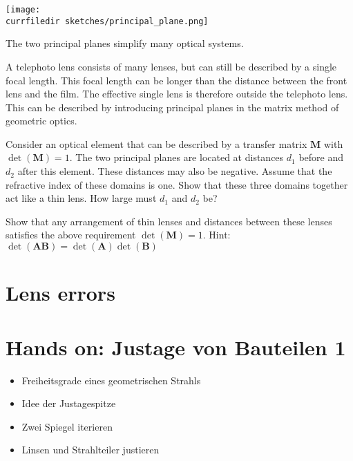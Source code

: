 \begin{marginfigure}
    \texttt{[image: \\currfiledir sketches/principal\_plane.png]}
   \caption{The two principal planes simplify many optical systems.}
\end{marginfigure}

\begin{questions}
\item A telephoto lens consists of many lenses, but can still be described by a single focal length. This focal length can be longer than the distance between the front lens and the film. The effective single lens is therefore outside the telephoto lens. This can be described by introducing principal planes in the matrix method of geometric optics.
 
   Consider an optical element that can be described by a transfer matrix $\boldsymbol{M}$ with $\det(\boldsymbol{M}) = 1$. The two principal planes are located at distances $d_1$ before and $d_2$ after this element. These distances may also be negative. Assume that the refractive index of these domains is one. Show that these three domains together act like a thin lens. How large must $d_1$ and $d_2$ be?  

\item  Show that any arrangement of thin lenses and distances between these lenses satisfies the above requirement $\det(\boldsymbol{M}) = 1$. \newline Hint: $\det(\boldsymbol{A} \boldsymbol{B} )  = \det(\boldsymbol{A})  \det(\boldsymbol{B}) $
\end{questions}

\section{Lens errors}

\section {Hands on: Justage von Bauteilen 1}

\begin{itemize}

\item {Freiheitsgrade eines geometrischen Strahls}
\item {Idee der Justagespitze}
\item{Zwei Spiegel iterieren}
\item {Linsen und Strahlteiler justieren }

\end{itemize}




\printbibliography[segment=\therefsegment,heading=subbibliography]
